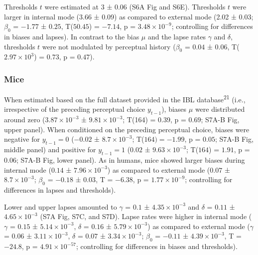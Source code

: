 \documentclass[
]{article}
\begin{document}
Thresholds \(t\) were estimated at 3 ± 0.06 (S6A Fig and
S6E). Thresholds \(t\) were larger in internal mode (3.66 ± 0.09) as
compared to external mode (2.02 ± 0.03; \(\beta_0\) = \(-1.77\) ±
\(0.25\), T(\(50.45\)) = \(-7.14\), p =
\(\ensuremath{3.48\times 10^{-9}}\); controlling for differences in
biases and lapses). In contrast to the bias \(\mu\) and the lapse rates
\(\gamma\) and \(\delta\), thresholds \(t\) were not modulated by
perceptual history (\(\beta_0\) = \(0.04\) ± \(0.06\),
T(\(\ensuremath{2.97\times 10^{3}}\)) = \(0.73\), p = \(0.47\)).

\hypertarget{mice}{%
\subsubsection{Mice}\label{mice}}

When estimated based on the full dataset provided in the IBL
database\textsuperscript{21} (i.e., irrespective of the preceding
perceptual choice \(y_{t-1}\)), biases \(\mu\) were distributed around
zero (\(\ensuremath{3.87\times 10^{-3}}\) ±
\(\ensuremath{9.81\times 10^{-3}}\); T(164) = 0.39, p = \(0.69\);
S7A-B Fig, upper panel). When conditioned on the
preceding perceptual choice, biases were negative for \(y_{t-1} = 0\)
(\(-0.02\) ± \(\ensuremath{8.7\times 10^{-3}}\); T(\(164) = -1.99\), p =
\(0.05\); S7A-B Fig, middle panel) and positive for
\(y_{t-1} = 1\) (\(0.02\) ± \(\ensuremath{9.63\times 10^{-3}}\);
T(\(164\)) = \(1.91\), p = \(0.06\); S7A-B Fig, lower
panel). As in humans, mice showed larger biases during internal mode
(\(0.14\) ± \(\ensuremath{7.96\times 10^{-3}}\)) as compared to external
mode (\(0.07\) ± \(\ensuremath{8.7\times 10^{-3}}\); \(\beta_0\) =
\(-0.18\) ± \(0.03\), T = \(-6.38\), p =
\(\ensuremath{1.77\times 10^{-9}}\); controlling for differences in
lapses and thresholds).

Lower and upper lapses amounted to \(\gamma\) = \(0.1\) ±
\(\ensuremath{4.35\times 10^{-3}}\) and \(\delta\) = \(0.11\) ±
\(\ensuremath{4.65\times 10^{-3}}\) (S7A Fig, S7C, and S7D).
Lapse rates were higher in internal mode (\(\gamma\) = \(0.15\) ±
\(\ensuremath{5.14\times 10^{-3}}\), \(\delta\) = \(0.16\) ±
\(\ensuremath{5.79\times 10^{-3}}\)) as compared to external mode
(\(\gamma\) = \(0.06\) ± \(\ensuremath{3.11\times 10^{-3}}\), \(\delta\)
= \(0.07\) ± \(\ensuremath{3.34\times 10^{-3}}\); \(\beta_0\) =
\(-0.11\) ± \(\ensuremath{4.39\times 10^{-3}}\), T = \(-24.8\), p =
\(\ensuremath{4.91\times 10^{-57}}\); controlling for differences in
biases and thresholds).
\end{document}

